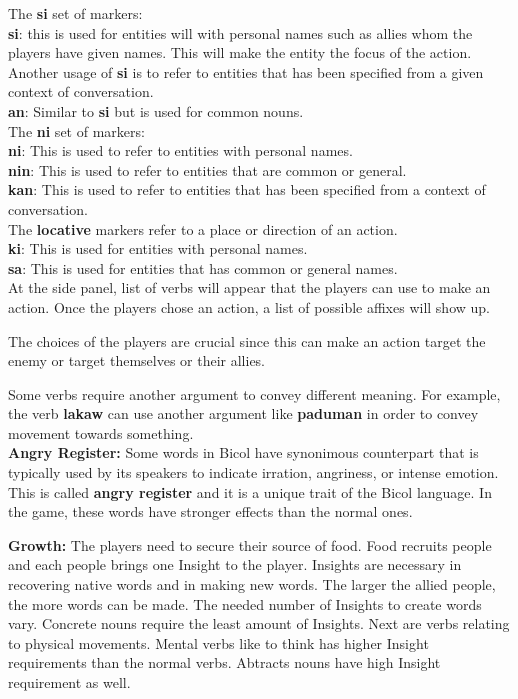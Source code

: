 \documentclass[11pt]{article}
\begin{document}
The \textbf{si} set of markers:\\
\textbf{si}: this is used for entities will with personal names such as allies whom the players have given names. This will make the entity the focus of the action. Another usage of \textbf{si} is to refer to entities that has been specified from a given context of conversation. \\
\textbf{an}: Similar to \textbf{si} but is used for common nouns.\\

The \textbf{ni} set of markers:\\
\textbf{ni}: This is used to refer to entities with personal names.\\
\textbf{nin}: This is used to refer to entities that are common or general.\\
\textbf{kan}: This is used to refer to entities that has been specified from a context of conversation.\\

The \textbf{locative} markers refer to a place or direction of an action.\\
\textbf{ki}: This is used for entities with personal names.\\
\textbf{sa}: This is used for entities that has common or general names.\\

At the side panel, list of verbs will appear that the players can use to make an action. Once the players chose an action, a list of possible affixes will show up.

The choices of the players are crucial since this can make an action target the enemy or target themselves or their allies.

Some verbs require another argument to convey different meaning. For example, the verb \textbf{lakaw} can use another argument like \textbf{paduman} in order to convey movement towards something.\\

\textbf{Angry Register:}
Some words in Bicol have synonimous counterpart that is typically used by its speakers to indicate irration, angriness, or intense emotion. This is called \textbf{angry register} and it is a unique trait of the Bicol language. In the game, these words have stronger effects than the normal ones.

\textbf{Growth:}
The players need to secure their source of food. Food recruits people and each people brings one Insight to the player. Insights are necessary in recovering native words and in making new words. The larger the allied people, the more words can be made. The needed number of Insights to create words vary.
Concrete nouns require the least amount of Insights. Next are verbs relating to physical movements. Mental verbs like to think has higher Insight requirements than the normal verbs. Abtracts nouns have high Insight requirement as well.
\end{document}

